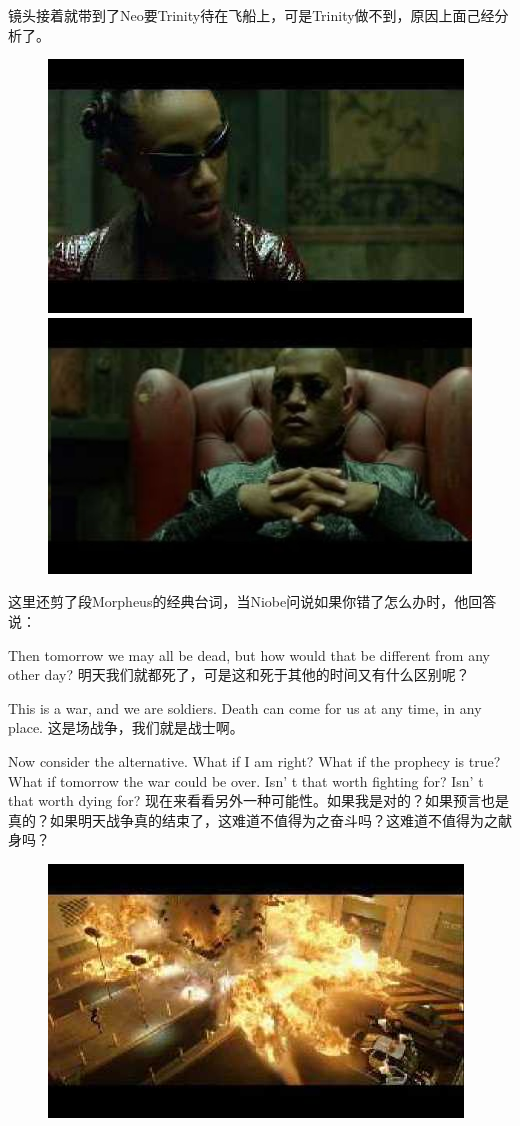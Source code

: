 \documentclass{ctexart}
\begin{document}
镜头接着就带到了Neo要Trinity待在飞船上，可是Trinity做不到，原因上面己经分析了。

\begin{figure}[htb]
\centering
\includegraphics[width=0.45\linewidth]{fig/read_reloaded-149}
\includegraphics[width=0.45\linewidth]{fig/read_reloaded-149-1}
\end{figure}

这里还剪了段Morpheus的经典台词，当Niobe问说如果你错了怎么办时，他回答说：

Then tomorrow we may all be dead, but how would that be different from any other day? 明天我们就都死了，可是这和死于其他的时间又有什么区别呢？

This is a war, and we are soldiers. Death can come for us at any time, in any place. 这是场战争，我们就是战士啊。

Now consider the alternative. What if I am right? What if the prophecy is true? What if tomorrow the war could be over. Isn' t that worth fighting for? Isn' t that worth dying for? 现在来看看另外一种可能性。如果我是对的？如果预言也是真的？如果明天战争真的结束了，这难道不值得为之奋斗吗？这难道不值得为之献身吗？

\begin{figure}[htb]
\centering
\includegraphics[width=0.5\linewidth]{fig/read_reloaded-150}
\end{figure}
\end{document}
